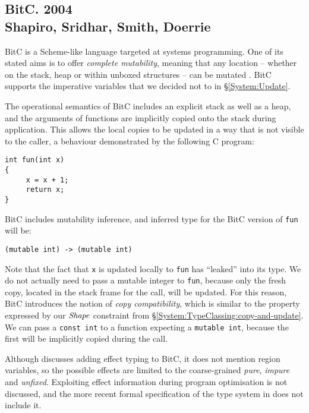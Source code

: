 \subsection{BitC. 2004 
	\\ Shapiro, Sridhar, Smith, Doerrie}

BitC \cite{shapiro:bitc-language-specification} is a Scheme-like language targeted at systems programming. One of its stated aims is to offer \emph{complete mutability}, meaning that any location -- whether on the stack, heap or within unboxed structures -- can be mutated \cite{sridhar:type-inference-systems-language}. BitC supports the imperative variables that we decided not to in \S\ref{System:Update}. 

The operational semantics of BitC includes an explicit stack as well as a heap, and the arguments of functions are implicitly copied onto the stack during application. This allows the local copies to be updated in a way that is not visible to the caller, a behaviour demonstrated by the following C program:
\begin{lstlisting}
int fun(int x)
{
     x = x + 1;
     return x;
}
\end{lstlisting}

BitC includes mutability inference, and inferred type for the BitC version of \texttt{fun} will be:
\begin{lstlisting}
(mutable int) -> (mutable int)
\end{lstlisting}
Note that the fact that \texttt{x} is updated locally to \texttt{fun} has ``leaked'' into its type. We do not actually need to pass a mutable integer to \texttt{fun}, because only the fresh copy, located in the stack frame for the call, will be updated. For this reason, BitC introduces the notion of \emph{copy compatibility}, which is similar to the property expressed by our $\operatorname{\mathit{Shape}}$ constraint from \S\ref{System:TypeClassing:copy-and-update}. We can pass a \mbox{\texttt{const int}} to a function expecting a \texttt{mutable int}, because the first will be implicitly copied during the call.

Although \cite{shapiro:origins-of-bitc} discusses adding effect typing to BitC, it does not mention region variables, so the possible effects are limited to the coarse-grained \emph{pure}, \emph{impure} and \emph{unfixed}. Exploiting effect information during program optimisation is not discussed, and the more recent formal specification of the type system in \cite{sridhar:formalization-of-bitc-type-system} does not include it. 


